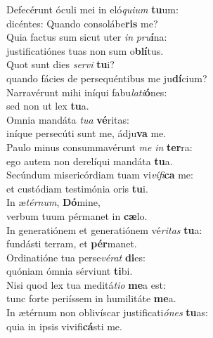 \evenverse Defecérunt óculi mei in eló\textit{qui}\textit{um} \textbf{tu}um:~\*\\
\evenverse dicéntes: Quando consolábe\textbf{ris} me?\\
\oddverse Quia factus sum sicut uter \textit{in} \textit{pru}\textbf{í}na:~\*\\
\oddverse justificatiónes tuas non sum o\textbf{blí}tus.\\
\evenverse Quot sunt dies \textit{ser}\textit{vi} \textbf{tu}i?~\*\\
\evenverse quando fácies de persequéntibus me ju\textbf{dí}cium?\\
\oddverse Narravérunt mihi iníqui fabu\textit{la}\textit{ti}\textbf{ó}nes:~\*\\
\oddverse sed non ut lex \textbf{tu}a.\\
\evenverse Omnia mandáta \textit{tu}\textit{a} \textbf{vé}ritas:~\*\\
\evenverse iníque persecúti sunt me, ádju\textbf{va} me.\\
\oddverse Paulo minus consummavérunt \textit{me} \textit{in} \textbf{ter}ra:~\*\\
\oddverse ego autem non derelíqui mandáta \textbf{tu}a.\\
\evenverse Secúndum misericórdiam tuam vi\textit{ví}\textit{fi}\textbf{ca} me:~\*\\
\evenverse et custódiam testimónia oris \textbf{tu}i.\\
\oddverse In æ\textit{tér}\textit{num}, \textbf{Dó}mine,~\*\\
\oddverse verbum tuum pérmanet in \textbf{cæ}lo.\\
\evenverse In generatiónem et generatiónem vé\textit{ri}\textit{tas} \textbf{tu}a:~\*\\
\evenverse fundásti terram, et \textbf{pér}manet.\\
\oddverse Ordinatióne tua perse\textit{vé}\textit{rat} \textbf{di}es:~\*\\
\oddverse quóniam ómnia sérviunt \textbf{ti}bi.\\
\evenverse Nisi quod lex tua meditá\textit{ti}\textit{o} \textbf{me}a est:~\*\\
\evenverse tunc forte periíssem in humilitáte \textbf{me}a.\\
\oddverse In ætérnum non oblivíscar justificati\textit{ó}\textit{nes} \textbf{tu}as:~\*\\
\oddverse quia in ipsis vivifi\textbf{cá}sti me.\\
